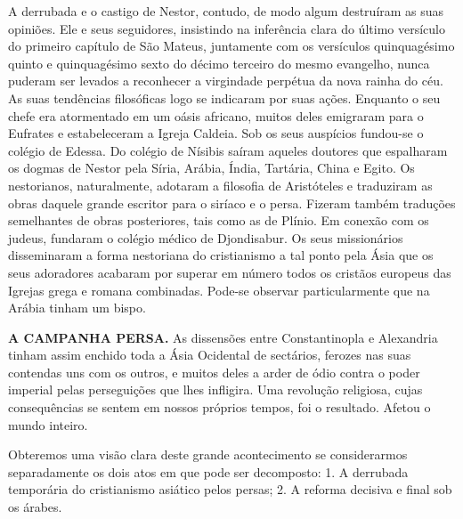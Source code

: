 \documentclass[11pt,a5paper,twoside,openany]{book}
\begin{document}
A derrubada e o castigo de Nestor, contudo, de modo algum destruíram as suas opiniões. Ele e seus seguidores, insistindo na inferência clara do último versículo do primeiro capítulo de São Mateus, juntamente com os versículos quinquagésimo quinto e quinquagésimo sexto do décimo terceiro do mesmo evangelho, nunca puderam ser levados a reconhecer a virgindade perpétua da nova rainha do céu. As suas tendências filosóficas logo se indicaram por suas ações. Enquanto o seu chefe era atormentado em um oásis africano, muitos deles emigraram para o Eufrates e estabeleceram a Igreja Caldeia. Sob os seus auspícios fundou-se o colégio de Edessa. Do colégio de Nísibis saíram aqueles doutores que espalharam os dogmas de Nestor pela Síria, Arábia, Índia, Tartária, China e Egito. Os nestorianos, naturalmente, adotaram a filosofia de Aristóteles e traduziram as obras daquele grande escritor para o siríaco e o persa. Fizeram também traduções semelhantes de obras posteriores, tais como as de Plínio. Em conexão com os judeus, fundaram o colégio médico de Djondisabur. Os seus missionários disseminaram a forma nestoriana do cristianismo a tal ponto pela Ásia que os seus adoradores acabaram por superar em número todos os cristãos europeus das Igrejas grega e romana combinadas. Pode-se observar particularmente que na Arábia tinham um bispo.

\textbf{A CAMPANHA PERSA.} As dissensões entre Constantinopla e Alexandria tinham assim enchido toda a Ásia Ocidental de sectários, ferozes nas suas contendas uns com os outros, e muitos deles a arder de ódio contra o poder imperial pelas perseguições que lhes infligira. Uma revolução religiosa, cujas consequências se sentem em nossos próprios tempos, foi o resultado. Afetou o mundo inteiro.

Obteremos uma visão clara deste grande acontecimento se considerarmos separadamente os dois atos em que pode ser decomposto: 1. A derrubada temporária do cristianismo asiático pelos persas; 2. A reforma decisiva e final sob os árabes.
\end{document}
